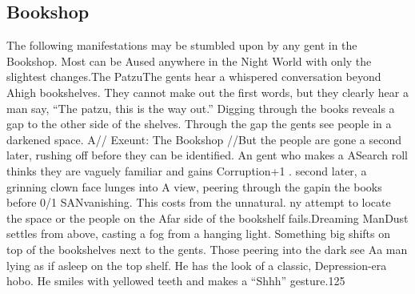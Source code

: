 \documentclass{report}
\begin{document}
\begin{multicols}{2}
\subsection{Bookshop }
The following manifestations may be stumbled upon by any gent in the Bookshop. Most can be Aused anywhere in the Night World with only the slightest changes.The PatzuThe gents hear a whispered conversation beyond Ahigh bookshelves. They cannot make out the first words, but they clearly hear a man say, “The patzu, this is the way out.” Digging through the books reveals a gap to the other side of the shelves. Through the gap the gents see people in a darkened space. A// Exeunt: The Bookshop //But the people are gone a second later, rushing off before they can be identified. An gent who makes a ASearch roll thinks they are vaguely familiar and gains Corruption+1 . second later, a grinning clown face lunges into A view, peering through the gapin the books before  0/1 SANvanishing. This costs from the unnatural. ny attempt to locate the space or the people on the Afar side of the bookshelf fails.Dreaming ManDust settles from above, casting a fog from a hanging light. Something big shifts on top of the bookshelves next to the gents. Those peering into the dark see Aa man lying as if asleep on the top shelf. He has the look of a classic, Depression-era hobo. He smiles with yellowed teeth and makes a “Shhh” gesture.125\newpage

\end{multicols}
\end{document}

